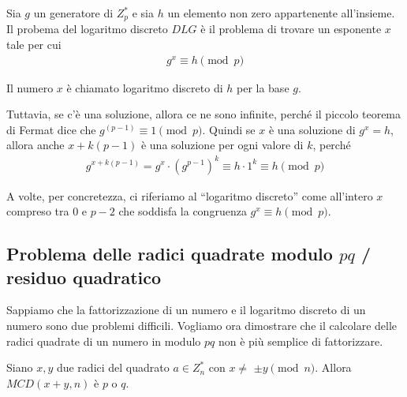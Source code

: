 \begin{definition}
Sia \(g\) un generatore di $Z_p^*$ e sia $h$ un elemento non zero appartenente all'insieme. Il probema del logaritmo discreto $DLG$ è il problema di trovare un esponente $x$ tale per cui
\begin{align*}
    g^x \equiv h \pmod p
\end{align*}

\noindent Il numero $x$ è chiamato logaritmo discreto di $h$ per la base $g$.
\end{definition}

\noindent Tuttavia, se c'è una soluzione, allora ce ne sono infinite, perché il piccolo teorema di Fermat dice che $g^{(p-1)} \equiv 1 \pmod p$. Quindi se $x$ è una soluzione di $g^x = h$, allora anche $x + k(p - 1)$ è una soluzione per ogni valore di $k$, perché
\begin{align*}
    g^{x+k(p-1)} = g^x \cdot (g^{p-1})^k \equiv h \cdot 1^k \equiv h \pmod p
\end{align*}

\noindent A volte, per concretezza, ci riferiamo al “logaritmo discreto” come all'intero $x$ compreso tra $0$ e $p - 2$ che soddisfa la congruenza $g^x \equiv h \pmod p$.

\subsection{Problema delle radici quadrate modulo $pq$ / residuo quadratico}
Sappiamo che la fattorizzazione di un numero e il logaritmo discreto di un numero sono due problemi difficili. Vogliamo ora dimostrare che il calcolare delle radici quadrate di un numero in modulo $pq$ non è più semplice di fattorizzare.
\begin{lemma}
Siano $x, y$ due radici del quadrato $a \in Z_n^*$ con $x \ne$ $\pm y \pmod n$. Allora $MCD(x+y, n)$ è $p$ o $q$.
\end{lemma}

